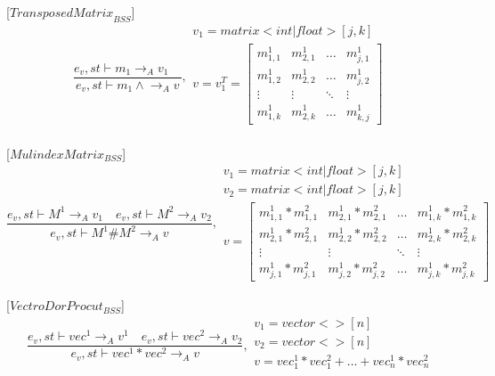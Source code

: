 [${TransposedMatrix}_{BSS}$]
\begin{equation}
	\frac { { e }_{ v },st\vdash { m }_{ 1 }{ \rightarrow  }_{ A }{ v }_{ 1 }\quad  }{ { e }_{ v },st\vdash { m }_{ 1 }\wedge { \rightarrow  }_{ A }{ v } } ,\begin{matrix} { v }_{ 1 }=matrix<int|float>[j,k] \\ { v }={ v }_{ 1 }^{ T }=\begin{bmatrix} { { m }_{ 1,1 }^{ 1 } } & { { m }_{ 2,1 }^{ 1 } } & \dots  & { m }_{ j,1 }^{ 1 } \\ { { m }_{ 1,2 }^{ 1 } } & { { m }_{ 2,2 }^{ 1 } } & \dots  & { m }_{ j,2 }^{ 1 } \\ \vdots  & \vdots  & \ddots  & \vdots  \\ { m }_{ 1,k }^{ 1 } & { m }_{ 2,k }^{ 1 } & \dots  & { m }_{ k,j }^{ 1 } \end{bmatrix} \\  \end{matrix}
\end{equation}

[${MulindexMatrix}_{BSS}$]
\begin{equation}
	\frac { { e }_{ v },st\vdash { M }^{ 1 }{ \rightarrow  }_{ A }{ v }_{ 1 }\quad { e }_{ v },st\vdash { M }^{ 2 }{ \rightarrow  }_{ A }{ v }_{ 2 } }{ { e }_{ v },st\vdash { M }^{ 1 }\#{ M }^{ 2 }{ \rightarrow  }_{ A }{ v } } ,\begin{matrix} { v }_{ 1 }=matrix<int|float>[j,k] \\ { { v }_{ 2 } }=matrix<int|float>[j,k] \\ v=\begin{bmatrix} { { m }_{ 1,1 }^{ 1 } }*{ { m }_{ 1,1 }^{ 2 } } & { { m }_{ 2,1 }^{ 1 } }*{ { m }_{ 2,1 }^{ 2 } } & \dots  & { m }_{ 1,k }^{ 1 }*{ { m }_{ 1,k }^{ 2 } } \\ { { m }_{ 2,1 }^{ 1 } }*{ { m }_{ 2,1 }^{ 2 } } & { { m }_{ 2,2 }^{ 1 } }*{ { m }_{ 2,2 }^{ 2 } } & \dots  & { { m }_{ 2,k }^{ 1 } }*{ { m }_{ 2,k }^{ 2 } } \\ \vdots  & \vdots  & \ddots  & \vdots  \\ { m }_{ j,1 }^{ 1 }*{ { m }_{ j,1 }^{ 2 } } & { { m }_{ j,2 }^{ 1 } }*{ { m }_{ j,2 }^{ 2 } } & \dots  & { m }_{ j,k }^{ 1 }*{ { m }_{ j,k }^{ 2 } } \end{bmatrix} \end{matrix}
\end{equation}

[${VectroDorProcut}_{BSS}$]
\begin{equation}
	\frac { { e }_{ v },st\vdash { { vec } }^{ 1 }{ \rightarrow  }_{ A }{ v }^{ 1 }\quad { e }_{ v },st\vdash { { { vec } }^{ 2 } }{ \rightarrow  }_{ A }{ v }_{ 2 } }{ { e }_{ v },st\vdash { { vec } }^{ 1 }\ast { { vec } }^{ 2 }{ \rightarrow  }_{ A }{ v } } ,\begin{matrix} { v }_{ 1 }=vector<>[{ n }] \\ { v }_{ 2 }=vector<>[{ n }] \\ v={ vec }_{ 1 }^{ 1 }*{ vec }_{ 1 }^{ 2 }+\dots +{ vec }_{ n }^{ 1 }*{ vec }_{ n }^{ 2 } \\  \end{matrix}
\end{equation}